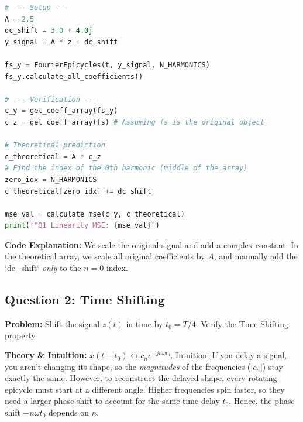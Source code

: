 \documentclass[11pt]{article}
\begin{document}
\begin{lstlisting}[language=Python]
# --- Setup ---
A = 2.5
dc_shift = 3.0 + 4.0j
y_signal = A * z + dc_shift

fs_y = FourierEpicycles(t, y_signal, N_HARMONICS)
fs_y.calculate_all_coefficients()

# --- Verification ---
c_y = get_coeff_array(fs_y)
c_z = get_coeff_array(fs) # Assuming fs is the original object

# Theoretical prediction
c_theoretical = A * c_z
# Find the index of the 0th harmonic (middle of the array)
zero_idx = N_HARMONICS 
c_theoretical[zero_idx] += dc_shift

mse_val = calculate_mse(c_y, c_theoretical)
print(f"Q1 Linearity MSE: {mse_val}")
\end{lstlisting}
\textbf{Code Explanation:} We scale the original signal and add a complex constant. In the theoretical array, we scale all original coefficients by $A$, and manually add the `dc_shift` \textit{only} to the $n=0$ index.

\subsection{Question 2: Time Shifting}
\textbf{Problem:} Shift the signal $z(t)$ in time by $t_0 = T/4$. Verify the Time Shifting property.

\textbf{Theory \& Intuition:} 
$x(t - t_0) \leftrightarrow c_n e^{-jn\omega t_0}$. 
Intuition: If you delay a signal, you aren't changing its shape, so the \textit{magnitudes} of the frequencies ($|c_n|$) stay exactly the same. However, to reconstruct the delayed shape, every rotating epicycle must start at a different angle. Higher frequencies spin faster, so they need a larger phase shift to account for the same time delay $t_0$. Hence, the phase shift $-n\omega t_0$ depends on $n$.
\end{document}
